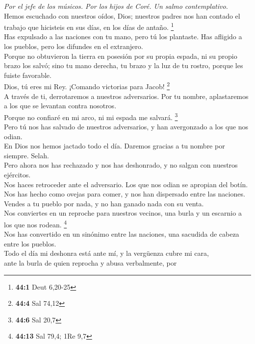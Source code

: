 \emph{Por el jefe de los músicos. Por los hijos de Coré. Un salmo
contemplativo.}\\
 Hemos escuchado con nuestros oídos, Dios; nuestros padres
nos han contado el trabajo que hicisteis en sus días, en los días de
antaño. \footnote{\textbf{44:1} Deut 6,20-25}\\
 Has expulsado a las naciones con tu mano, pero tú los
plantaste. Has afligido a los pueblos, pero los difundes en el
extranjero.\\
 Porque no obtuvieron la tierra en posesión por su propia
espada, ni su propio brazo los salvó; sino tu mano derecha, tu brazo y
la luz de tu rostro, porque les fuiste favorable.\\
 Dios, tú eres mi Rey. ¡Comando victorias para Jacob!
\footnote{\textbf{44:4} Sal 74,12}\\
 A través de ti, derrotaremos a nuestros adversarios. Por
tu nombre, aplastaremos a los que se levantan contra nosotros.\\
 Porque no confiaré en mi arco, ni mi espada me salvará.
\footnote{\textbf{44:6} Sal 20,7}\\
 Pero tú nos has salvado de nuestros adversarios, y han
avergonzado a los que nos odian.\\
 En Dios nos hemos jactado todo el día. Daremos gracias a
tu nombre por siempre. Selah.\\
 Pero ahora nos has rechazado y nos has deshonrado, y no
salgan con nuestros ejércitos.\\
 Nos haces retroceder ante el adversario. Los que nos
odian se apropian del botín.\\
 Nos has hecho como ovejas para comer, y nos han
dispersado entre las naciones.\\
 Vendes a tu pueblo por nada, y no han ganado nada con su
venta.\\
 Nos conviertes en un reproche para nuestros vecinos, una
burla y un escarnio a los que nos rodean. \footnote{\textbf{44:13} Sal
  79,4; 1Re 9,7}\\
 Nos has convertido en un sinónimo entre las naciones,
una sacudida de cabeza entre los pueblos.\\
 Todo el día mi deshonra está ante mí, y la vergüenza
cubre mi cara,\\
 ante la burla de quien reprocha y abusa verbalmente, por
